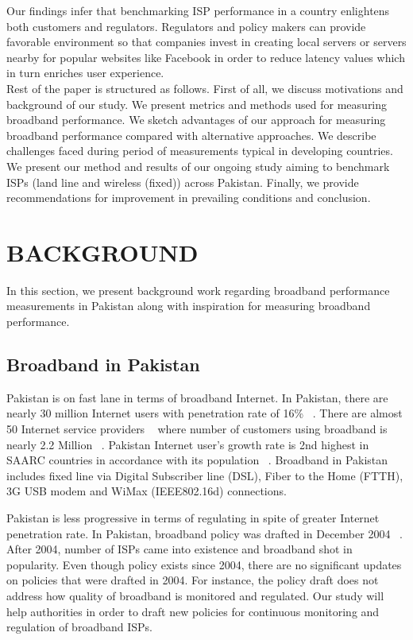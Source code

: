 \documentclass{sig-alternate-10pt}
\begin{document}
\begin{sloppypar}
\indent Our findings infer that benchmarking ISP performance in a country enlightens both customers and regulators. Regulators and policy makers can provide favorable environment so that companies invest in creating local servers or servers nearby for popular websites like Facebook in order to reduce latency values which in turn enriches user experience.\\
\indent Rest of the paper is structured as follows.  First of all, we discuss motivations and background of our study. We present metrics and methods used for measuring broadband performance. We sketch advantages of our approach for measuring broadband performance compared with alternative approaches. We describe challenges faced during period of measurements typical in developing countries. We present our method and results of our ongoing study aiming to benchmark ISPs (land line and wireless (fixed)) across Pakistan.  Finally, we provide recommendations for improvement in prevailing conditions and conclusion.

\section{BACKGROUND}
In this section, we present background work regarding broadband performance measurements in Pakistan along with inspiration for measuring broadband performance.
\subsection {Broadband in Pakistan}
Pakistan is on fast lane in terms of broadband Internet. In Pakistan, there are nearly 30 million Internet users with penetration rate of 16\% ~\cite{01}. There are almost 50 Internet service providers ~\cite{01} where number of customers using broadband is nearly 2.2 Million ~\cite{02}. Pakistan Internet user's growth rate is 2nd highest in SAARC countries in accordance with its population ~\cite{02}. Broadband in Pakistan includes fixed line via Digital Subscriber line (DSL), Fiber to the Home (FTTH), 3G USB modem and WiMax (IEEE802.16d) connections.

\indent Pakistan is less progressive in terms of regulating in spite of greater Internet penetration rate. In Pakistan,  broadband policy was drafted in December 2004 ~\cite{03}. After 2004, number of ISPs came into existence and broadband shot in popularity. Even though policy exists since 2004, there are no significant updates on policies that were drafted in 2004. For instance, the policy draft does not address how quality of broadband is monitored and regulated. Our study will help authorities in order to draft new policies for continuous monitoring and regulation of broadband ISPs.


\end{sloppypar}
\end{document}
